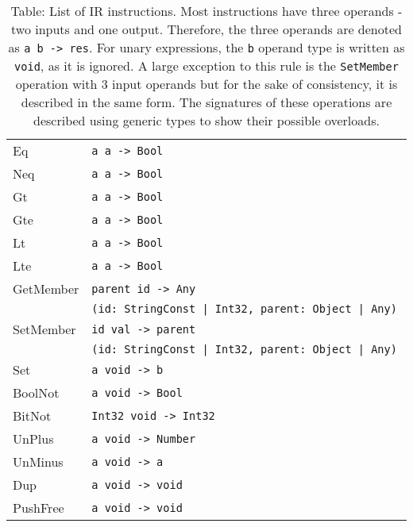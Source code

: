 \begin{table}
\begin{tabular}{l | l}
        Eq          & \texttt{a      a     -> Bool                                                    } \\
        Neq         & \texttt{a      a     -> Bool                                                    } \\
        Gt          & \texttt{a      a     -> Bool                                                    } \\
        Gte         & \texttt{a      a     -> Bool                                                    } \\
        Lt          & \texttt{a      a     -> Bool                                                    } \\
        Lte         & \texttt{a      a     -> Bool                                                    } \\
        GetMember   & \texttt{parent id    -> Any     }\\
                    & \texttt{(id: StringConst | Int32, parent: Object | Any) } \\
        SetMember   & \texttt{id     val   -> parent  }\\
                    & \texttt{(id: StringConst | Int32, parent: Object | Any) } \\
        Set         & \texttt{a      void  -> b                                                       } \\
        BoolNot     & \texttt{a      void  -> Bool                                                    } \\
        BitNot      & \texttt{Int32  void  -> Int32                                                   } \\
        UnPlus      & \texttt{a      void  -> Number                                                  } \\
        UnMinus     & \texttt{a      void  -> a                                                       } \\
        Dup         & \texttt{a      void  -> void                                                    } \\
        PushFree    & \texttt{a      void  -> void                                                    }
    \end{tabular}
    \caption{Table: List of IR instructions. Most instructions have three operands - two inputs and one output. Therefore, the three operands are denoted as \texttt{a b -> res}. For unary expressions, the \texttt{b} operand type is written as \texttt{void}, as it is ignored. A large exception to this rule is the \texttt{SetMember} operation with 3 input operands but for the sake of consistency, it is described in the same form. The signatures of these operations are described using generic types to show their possible overloads.}
    \label{tab:opcodes}
\end{table}


